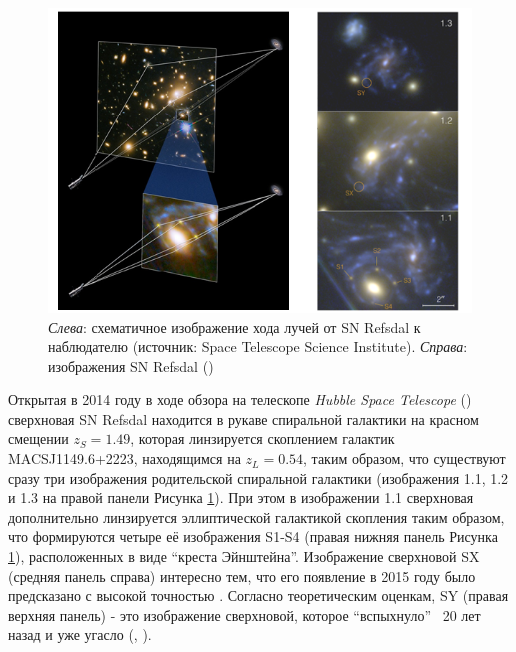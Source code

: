 \begin{figure}[H]
    \centering
	\includegraphics[scale=0.99]{pics/snrefsdal.png}
	\caption{\textit{Слева}: схематичное изображение хода лучей от SN Refsdal к  наблюдателю (источник: Space Telescope Science Institute). \textit{Справа}: изображения SN Refsdal (\cite{treu2015}) \label{fig:snrefsdalfig}}
\end{figure}

Открытая в 2014 году в ходе обзора на телескопе \textit{Hubble Space Telescope} (\cite{kelly2014}) сверхновая SN Refsdal находится в рукаве спиральной галактики на красном смещении $z_S= 1.49$, которая линзируется скоплением галактик MACSJ1149.6+2223, находящимся на $z_L = 0.54$, 
таким образом, что существуют сразу три изображения родительской спиральной галактики (изображения 1.1, 1.2 и 1.3 на правой панели Рисунка \ref{fig:snrefsdalfig}). При этом в изображении 1.1 сверхновая дополнительно линзируется эллиптической галактикой скопления таким образом, что формируются четыре её изображения S1-S4 (правая нижняя панель Рисунка \ref{fig:snrefsdalfig}), расположенных в виде “креста Эйнштейна”. Изображение сверхновой SX (средняя панель справа) интересно тем, что его появление в 2015 году было предсказано с высокой точностью . Согласно теоретическим оценкам, SY (правая верхняя панель) - это изображение сверхновой, которое “вспыхнуло” ~20 лет назад и уже угасло  (\cite{kelly2014}, \cite{treu2016}).


